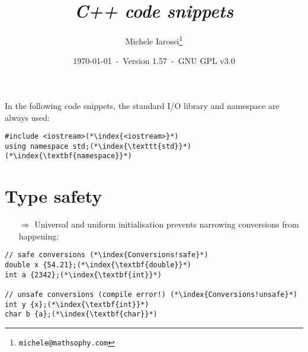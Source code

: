 \documentclass[10pt]{article}
\begin{document}
\title{\emph{C++ code snippets}}
\author{Michele Iarossi\thanks{\texttt{michele@mathsophy.com}}}
\date{\small \today~-~Version 1.57~-~GNU GPL v3.0}


\maketitle

\small

\begin{frame}{}
\setlength\columnsep{1cm}
\begin{multicols}{2}
\tableofcontents
\end{multicols}
\end{frame}

\noindent
In the following code snippets, the standard I/O library and namespace are always used:
\begin{lstlisting}
#include <iostream>(*\index{<iostream>}*)
using namespace std;(*\index{\texttt{std}}*)(*\index{\textbf{namespace}}*)
\end{lstlisting}

\newpage
%
%
\section{Type safety}
\small
\begin{enumerate}
\item[$\Rightarrow$] Universal and uniform initialisation prevents narrowing conversions from happening:
\end{enumerate}
\begin{lstlisting}
// safe conversions (*\index{Conversions!safe}*)
double x {54.21};(*\index{\textbf{double}}*)
int a {2342};(*\index{\textbf{int}}*)

// unsafe conversions (compile error!) (*\index{Conversions!unsafe}*)
int y {x};(*\index{\textbf{int}}*)
char b {a};(*\index{\textbf{char}}*)
\end{lstlisting}
%
%
\end{document}
